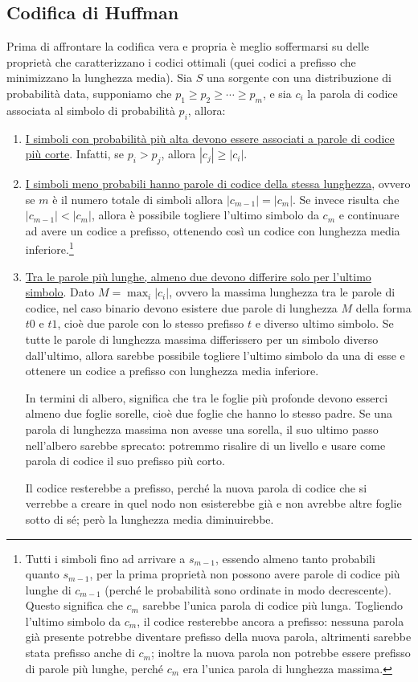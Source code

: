 \documentclass{article}
\theoremstyle{definition}
\numberwithin{equation}{section}
\begin{document}
\subsection{Codifica di Huffman}
Prima di affrontare la codifica vera e propria è meglio soffermarsi su delle proprietà che caratterizzano i codici ottimali (quei codici a prefisso che minimizzano la lunghezza media). Sia $S$ una sorgente con una distribuzione di probabilità data, supponiamo che $p_1 \geq p_2 \geq \cdots \geq p_m$, e sia $c_i$ la parola di codice associata al simbolo di probabilità $p_i$, allora:
\begin{enumerate}
    \item \uline{I simboli con probabilità più alta devono essere associati a parole di codice più corte}. Infatti, se $p_i > p_j$, allora $|c_j| \geq |c_i|$.
    \item \uline{I simboli meno probabili hanno parole di codice della stessa lunghezza}, ovvero se $m$ è il numero totale di simboli allora $|c_{m-1}| = |c_m|$. Se invece risulta che $|c_{m-1}| < |c_m|$, allora è possibile togliere l'ultimo simbolo da $c_m$ e continuare ad avere un codice a prefisso, ottenendo così un codice con lunghezza media inferiore.\footnote{Tutti i simboli fino ad arrivare a $s_{m-1}$, essendo almeno tanto probabili quanto $s_{m-1}$, per la prima proprietà non possono avere parole di codice più lunghe di $c_{m-1}$ (perché le probabilità sono ordinate in modo decrescente). Questo significa che $c_m$ sarebbe l'unica parola di codice più lunga. Togliendo l'ultimo simbolo da $c_m$, il codice resterebbe ancora a prefisso: nessuna parola già presente potrebbe diventare prefisso della nuova parola, altrimenti sarebbe stata prefisso anche di $c_m$; inoltre la nuova parola non potrebbe essere prefisso di parole più lunghe, perché $c_m$ era l'unica parola di lunghezza massima.}
    \item \uline{Tra le parole più lunghe, almeno due devono differire solo per l'ultimo simbolo}. Dato $M=\max_i |c_i|$, ovvero la massima lunghezza tra le parole di codice, nel caso binario devono esistere due parole di lunghezza $M$ della forma $t0$ e $t1$, cioè due parole con lo stesso prefisso $t$ e diverso ultimo simbolo. Se tutte le parole di lunghezza massima differissero per un simbolo diverso dall'ultimo, allora sarebbe possibile togliere l'ultimo simbolo da una di esse e ottenere un codice a prefisso con lunghezza media inferiore.

          In termini di albero, significa che tra le foglie più profonde devono esserci almeno due foglie sorelle, cioè due foglie che hanno lo stesso padre. Se una parola di lunghezza massima non avesse una sorella, il suo ultimo passo nell'albero sarebbe sprecato: potremmo risalire di un livello e usare come parola di codice il suo prefisso più corto.

          Il codice resterebbe a prefisso, perché la nuova parola di codice che si verrebbe a creare in quel nodo non esisterebbe già e non avrebbe altre foglie sotto di sé; però la lunghezza media diminuirebbe.
\end{enumerate}
\end{document}
